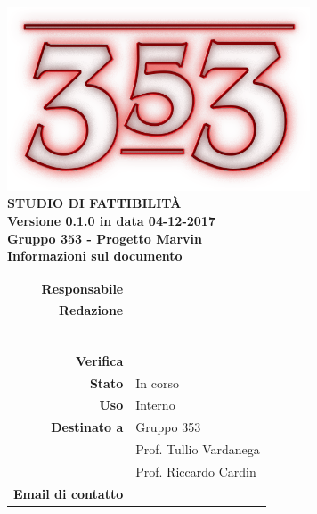 \documentclass[openany, a4paper, 12pt]{report}
\begin{document}
\begin{titlepage}
	\centering
	\vfill
	{
		\bfseries
		\vskip2cm
		\includegraphics[width=9cm]{../../common/images/logo.png} \\
		\vfill
		\Huge{STUDIO DI FATTIBILITÀ}\\
		\vfill
		\Large Versione 0.1.0 in data 04-12-2017\\
		\large Gruppo 353 - Progetto Marvin \\
		\vfill
	\normalsize Informazioni sul documento\\
\begin{table}[htbp]
	\centering
	\renewcommand\arraystretch{1.2}
	\begin{tabular}{r|l}
		\hline
		\textbf{Responsabile}	& \\
		
		\textbf{Redazione} 		& \Davide\\
								& \Elena\\
								& \Gianluca\\
								& \Mirco\\
								& \Parwinder\\
								& \Riccardo\\
								& \Valentina\\
								
		\textbf{Verifica} 		& \\		
							
		\textbf{Stato} 			& In corso\\
		
		\textbf{Uso}			& Interno\\
		
		\textbf{Destinato a}   	& Gruppo 353\\
								& Prof. Tullio Vardanega\\
								& Prof. Riccardo Cardin\\
		
				\textbf{Email di contatto}	& \mailleaf
	\end{tabular}
\end{table}
		\vfill
	}    
\end{titlepage}

\tableofcontents
\newpage
{}









 
\end{document}

